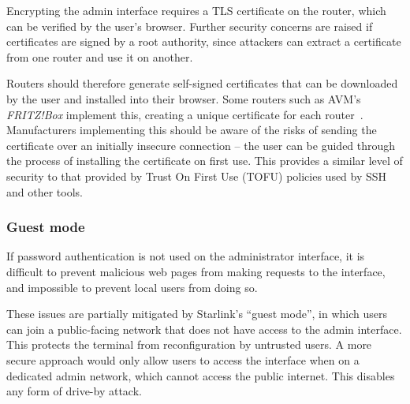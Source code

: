 Encrypting the admin interface requires a TLS certificate on the router, which can be verified by the user's browser.
Further security concerns are raised if certificates are signed by a root authority, since attackers can extract a certificate from one router and use it on another.

Routers should therefore generate self-signed certificates that can be downloaded by the user and installed into their browser.
Some routers such as AVM's \textit{FRITZ!Box} implement this, creating a unique certificate for each router~\cite{fritzbox_cert}.
Manufacturers implementing this should be aware of the risks of sending the certificate over an initially insecure connection -- the user can be guided through the process of installing the certificate on first use.
This provides a similar level of security to that provided by Trust On First Use (TOFU) policies used by SSH and other tools.

\subsubsection{Guest mode}

If password authentication is not used on the administrator interface, it is difficult to prevent malicious web pages from making requests to the interface, and impossible to prevent local users from doing so.

These issues are partially mitigated by Starlink's ``guest mode'', in which users can join a public-facing network that does not have access to the admin interface.
This protects the terminal from reconfiguration by untrusted users.
A more secure approach would only allow users to access the interface when on a dedicated admin network, which cannot access the public internet.
This disables any form of drive-by attack.
